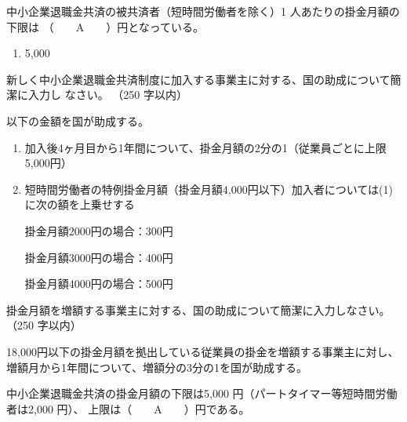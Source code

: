 \begin{fillblank}[年金1 2018 問題1(5)\textcircled{5}]
中小企業退職金共済の被共済者（短時間労働者を除く）1 人あたりの掛金月額の下限は
（　　A　　）円となっている。
\end{fillblank}

\begin{answerbox}
  \begin{enumerate}[A:]
    \item 5,000
  \end{enumerate}
\end{answerbox}

\begin{shortanswer}[年金1 2023 問題2(4)ア]
新しく中小企業退職金共済制度に加入する事業主に対する、国の助成について簡潔に入力し
なさい。 （250 字以内）
\end{shortanswer}

\begin{answerbox}
  以下の金額を国が助成する。
  \begin{enumerate}[(1)]
    \item 加入後4ヶ月目から1年間について、掛金月額の2分の1（従業員ごとに上限5,000円）
    \item 短時間労働者の特例掛金月額（掛金月額4,000円以下）加入者については(1)に次の額を上乗せする
    
    掛金月額2000円の場合：300円

    掛金月額3000円の場合：400円

    掛金月額4000円の場合：500円
  \end{enumerate}
  
\end{answerbox}

\begin{shortanswer}[年金1 2023 問題2(4)イ]
掛金月額を増額する事業主に対する、国の助成について簡潔に入力しなさい。 （250 字以内）
\end{shortanswer}

\begin{answerbox}
  18,000円以下の掛金月額を拠出している従業員の掛金を増額する事業主に対し、増額月から1年間について、増額分の3分の1を国が助成する。
\end{answerbox}


\begin{fillblank}[年金1 2024 問題1(6)イ]
中小企業退職金共済の掛金月額の下限は5,000 円（パートタイマー等短時間労働者は2,000 円）、
上限は（　　A　　）円である。
\end{fillblank}

